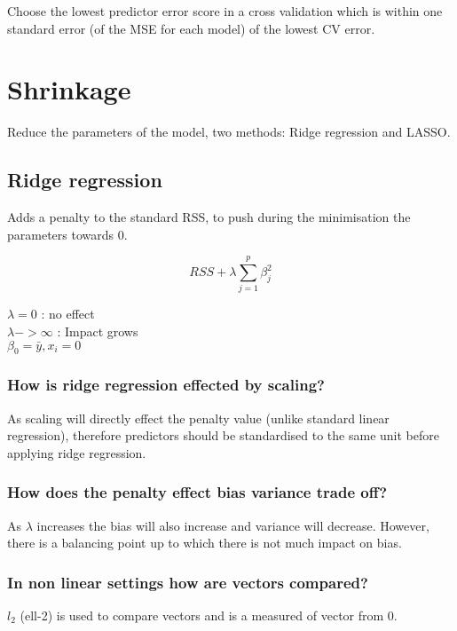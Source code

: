 \documentclass[11pt]{scrartcl} %
\begin{document}
Choose the lowest predictor error score in a cross validation which is within one standard error (of the MSE for each model)
of the lowest CV error.

\section{Shrinkage}

Reduce the parameters of the model, two methods: Ridge regression and LASSO.

\subsection{Ridge regression}

Adds a penalty to the standard RSS, to push during the minimisation the parameters towards 0.

\begin{equation}
	RSS + \lambda \sum^p_{j=1}{\beta^2_j}
\end{equation}

\(\lambda =0\) : no effect\\
\(\lambda ->\infty \) : Impact grows\\
\(\beta_0 = \bar{y},x_i=0\) 

\subsubsection{How is ridge regression effected by scaling?}

As scaling will directly effect the penalty value (unlike standard linear regression), therefore
predictors should be standardised to the same unit before applying ridge regression.

\subsubsection{How does the penalty effect bias variance trade off?}

As \(\lambda\) increases the bias will also increase and variance will decrease. However, there
is a balancing point up to which there is not much impact on bias.

\subsubsection{In non linear settings how are vectors compared?}

\(l_2\) (ell-2) is used to compare vectors and is a measured of vector from 0.
\end{document}
